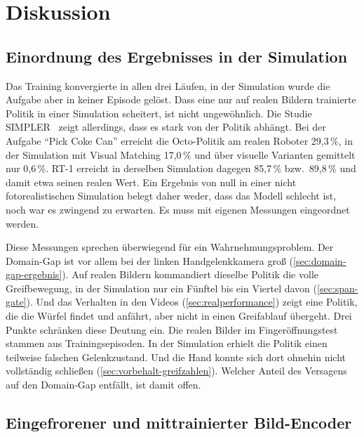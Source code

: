 
\chapter{Diskussion}
\label{chap:diskussion}

\section{Einordnung des Ergebnisses in der Simulation}
\label{sec:einordnung-null}

Das Training konvergierte in allen drei Läufen, in der Simulation wurde die
Aufgabe aber in keiner Episode gelöst. Dass eine nur auf realen Bildern
trainierte Politik in einer Simulation scheitert, ist nicht ungewöhnlich. Die
Studie SIMPLER~\cite{simpler2024} zeigt allerdings, dass es stark von der
Politik abhängt. Bei der Aufgabe \enquote{Pick Coke Can} erreicht die
Octo-Politik am realen Roboter 29,3\,\%, in der Simulation mit Visual Matching
17,0\,\% und über visuelle Varianten gemittelt nur 0,6\,\%. RT-1 erreicht in
derselben Simulation dagegen 85,7\,\% bzw.\ 89,8\,\% und damit etwa seinen
realen Wert. Ein Ergebnis von null in einer nicht fotorealistischen Simulation
belegt daher weder, dass das Modell schlecht ist, noch war es zwingend zu
erwarten. Es muss mit eigenen Messungen eingeordnet werden.

Diese Messungen sprechen überwiegend für ein Wahrnehmungsproblem. Der
Domain-Gap ist vor allem bei der linken Handgelenkkamera groß
(\cref{sec:domain-gap-ergebnis}). Auf realen Bildern kommandiert dieselbe
Politik die volle Greifbewegung, in der Simulation nur ein Fünftel bis ein
Viertel davon (\cref{sec:span-gate}). Und das Verhalten in den Videos
(\cref{sec:realperformance}) zeigt eine Politik, die die Würfel findet und
anfährt, aber nicht in einen Greifablauf übergeht. Drei Punkte schränken diese
Deutung ein. Die realen Bilder im Fingeröffnungstest stammen aus
Trainingsepisoden. In der Simulation erhielt die Politik einen teilweise
falschen Gelenkzustand. Und die Hand konnte sich dort ohnehin nicht
vollständig schließen (\cref{sec:vorbehalt-greifzahlen}). Welcher Anteil des
Versagens auf den Domain-Gap entfällt, ist damit offen.

\section{Eingefrorener und mittrainierter Bild-Encoder}
\label{sec:frozen-vs-tuned}


